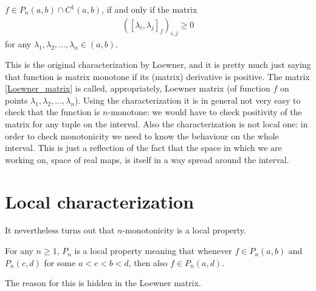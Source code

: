 \begin{lause}\label{loewner_char}
	$f \in P_{n}(a, b) \cap C^{1}(a, b)$, if and only if the matrix
	\begin{align}\label{Loewner_matrix}
		\left([\lambda_{i}, \lambda_{j}]_{f}\right)_{i, j} \geq 0
	\end{align}
	for any $\lambda_{1}, \lambda_{2}, \ldots, \lambda_{n} \in (a, b)$.
\end{lause}

This is the original characterization by Loewner, and it is pretty much just saying that function is matrix monotone if its (matrix) derivative is positive. The matrix \ref{Loewner_matrix} is called, appropriately, Loewner matrix (of function $f$ on points $\lambda_{1}, \lambda_{2}, \ldots, \lambda_{n}$). Using the characterization it is in general not very easy to check that the function is $n$-monotone: we would have to check positivity of the matrix for any tuple on the interval. Also the characterization is not local one: in order to check monotonicity we need to know the behaviour on the whole interval. This is just a reflection of the fact that the space in which we are working on, space of real maps, is itself in a way spread around the interval.

\section{Local characterization}

It nevertheless turns out that $n$-monotonicity is a local property.

\begin{prop}
	For any $n \geq 1$, $P_{n}$ is a local property meaning that whenever $f \in P_{n}(a, b)$ and $P_{n}(c, d)$ for some $a < c < b < d$, then also $f \in P_{n}(a, d)$.
\end{prop}

The reason for this is hidden in the Loewner matrix.

